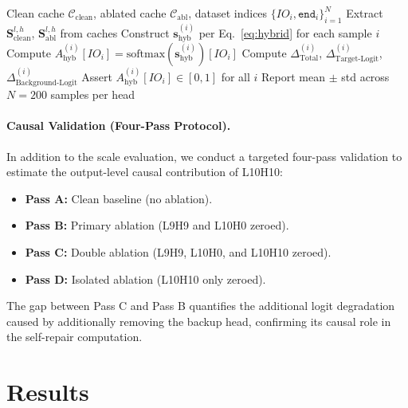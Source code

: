 \documentclass[12pt,a4paper]{article}
\begin{document}
\begin{algorithm}[!htbp]
\caption{Vectorized FALI Across All Heads}
\begin{algorithmic}[1]
  \Require Clean cache $\mathcal{C}_\text{clean}$, ablated cache $\mathcal{C}_\text{abl}$,
           dataset indices $\{IO_i, \texttt{end}_i\}_{i=1}^N$
      \State Extract $\mathbf{S}^{l,h}_\text{clean}$, $\mathbf{S}^{l,h}_\text{abl}$ from caches
      \State Construct $\mathbf{s}^{(i)}_\text{hyb}$ per Eq.~\ref{eq:hybrid} for each sample $i$
      \State Compute $A^{(i)}_\text{hyb}[IO_i] = \text{softmax}(\mathbf{s}^{(i)}_\text{hyb})[IO_i]$
      \State Compute $\Delta^{(i)}_\text{Total}$, $\Delta^{(i)}_\text{Target-Logit}$, $\Delta^{(i)}_\text{Background-Logit}$
      \State Assert $A^{(i)}_\text{hyb}[IO_i] \in [0, 1]$ for all $i$
    \EndFor
  \EndFor
  \State Report mean $\pm$ std across $N=200$ samples per head
\end{algorithmic}
\end{algorithm}

\paragraph{Causal Validation (Four-Pass Protocol).} In addition to the
scale evaluation, we conduct a targeted four-pass validation to estimate the
output-level causal contribution of L10H10:
\begin{itemize}
  \item \textbf{Pass A:} Clean baseline (no ablation).
  \item \textbf{Pass B:} Primary ablation (L9H9 and L10H0 zeroed).
  \item \textbf{Pass C:} Double ablation (L9H9, L10H0, and L10H10 zeroed).
  \item \textbf{Pass D:} Isolated ablation (L10H10 only zeroed).
\end{itemize}
The gap between Pass C and Pass B quantifies the additional logit degradation
caused by additionally removing the backup head, confirming its causal role in
the self-repair computation.

\section{Results}
\label{sec:results}
\end{document}
